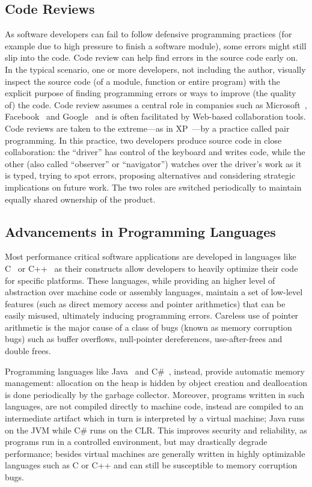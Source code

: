 \subsection{Code Reviews}
As software developers can fail to follow defensive programming practices (for
example due to high pressure to finish a software module), some errors might
still slip into the code. Code review can help find errors in the source code
early on. In the typical scenario, one or more developers, not including the
author, visually inspect the source code (of a module, function or entire
program) with the explicit purpose of finding programming errors or ways to
improve (the quality of) the code. Code review assumes a central role in
companies such as Microsoft~\cite{bacchelli2013expectations},
Facebook~\cite{feitelson2013development} and Google~\cite{kennedy2006google} and
is often facilitated by Web-based collaboration tools. Code reviews are taken to
the extreme---as in \ac{XP}~\cite{Beck2004EPE}---by a practice called pair
programming. In this practice, two developers produce source code in close
collaboration: the ``driver'' has control of the keyboard and writes code, while
the other (also called ``observer'' or ``navigator'') watches over the driver's
work as it is typed, trying to spot errors, proposing alternatives and
considering strategic implications on future work. The two roles are switched
periodically to maintain equally shared ownership of the product.

\subsection{Advancements in Programming Languages}
Most performance critical software applications are developed in languages like
C~\cite{Kernighan1988CPL} or C++~\cite{Stroustrup2013CPL} as their constructs
allow developers to heavily optimize their code for specific platforms. These
languages, while providing an higher level of abstraction over machine code or
assembly languages, maintain a set of low-level features (such as direct memory
access and pointer arithmetics) that can be easily misused, ultimately inducing
programming errors. Careless use of pointer arithmetic is the major cause of a
class of bugs (known as memory corruption bugs) such as buffer overflows,
null-pointer dereferences, use-after-frees and double frees.

Programming languages like Java~\cite{Gosling2014JLS} and
C\#~\cite{Hejlsberg2003CLS}, instead, provide automatic memory management:
allocation on the heap is hidden by object creation and deallocation is done
periodically by the garbage collector. Moreover, programs written in such
languages, are not compiled directly to machine code, instead are compiled to an
intermediate artifact which in turn is interpreted by a virtual machine; Java
runs on the \ac{JVM} while C\# runs on the \ac{CLR}. This improves security and
reliability, as programs run in a controlled environment, but may drastically
degrade performance; besides virtual machines are generally written in highly
optimizable languages such as C or C++ and can still be susceptible to memory
corruption bugs.

